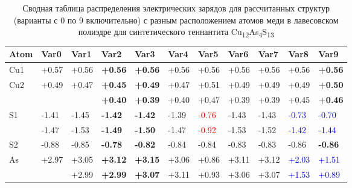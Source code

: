 \begin{landscape}
\begin{table} [htbp]
\centering

\caption{Сводная таблица распределения электрических зарядов для рассчитанных структур (варианты с 0 по 9 включительно) с разным расположением атомов меди в лавесовском полиэдре для синтетического теннантита Cu\textsubscript{12}As\textsubscript{4}S\textsubscript{13}}%
	\label{mod_char1}%
    \renewcommand{\arraystretch}{1.5}
    \begin{tabular}{@{}@{\extracolsep{10pt}}lllllllllll@{}}
      \toprule     %
Atom & Var0          & Var1          & Var2          & Var3          & Var4   & Var5          & Var6          & Var7          & Var8          & Var9              \\  \midrule
Cu1                  & +0.57	                & +0.56	                  & {\bf +0.56 }	& {\bf +0.56 }	& +0.56	& +0.56	                  & +0.56	& +0.56	& +0.56	                  & {\bf +0.56} \\
\multirow{2}{*}{Cu2} & \multirow{2}{*}{+0.49}	& \multirow{2}{*}{+0.47}	& {\bf +0.45 }	& {\bf +0.49 }	& +0.47 & +0.51	                  & +0.49	& +0.49	& +0.49	                  & {\bf +0.50} \\
		                 &		                    &                         & {\bf +0.40 }	& {\bf +0.39 }	& +0.40	& +0.47	                  & +0.39	& +0.39	& +0.45	                  & {\bf +0.46} \\
\multirow{2}{*}{S1}  & -1.41	                & -1.45	                  & {\bf -1.42 }  & {\bf -1.42 }	& -1.39	& \textcolor{red}{-0.76}	& -1.43	& -1.43	& \textcolor{blue}{-0.73}	& \textcolor{blue}{-0.70} \\
                     & -1.47	                & -1.53	                  & {\bf -1.49 }  & {\bf -1.50 }	& -1.47	& \textcolor{red}{-0.92}	& -1.53	& -1.52	& \textcolor{blue}{-1.42}	& \textcolor{blue}{-1.44} \\
S2                   & -0.88	                & -0.85	                  & {\bf -0.78 }  & {\bf -0.82 }	& -0.84	& -0.84	                  & -0.83	& -0.83	& -0.86	                  & {\bf -0.86} \\
\multirow{2}{*}{As}  & \multirow{2}{*}{+2.97}	& +3.05	                  & {\bf +3.12 }	& {\bf +3.15 }	& +3.06	& +0.86	                  & +3.11	& +3.12	& \textcolor{blue}{+2.03}	& \textcolor{blue}{+1.51} \\
	                   &                        & +2.99	                  & {\bf +2.99 }  & {\bf +3.07 }	& +3.11	& +0.93	                  & +3.06	& +3.07	& \textcolor{blue}{+1.53}	& \textcolor{blue}{+0.89} \\
\bottomrule

\end{tabular}
\end{table}
\end{landscape}

